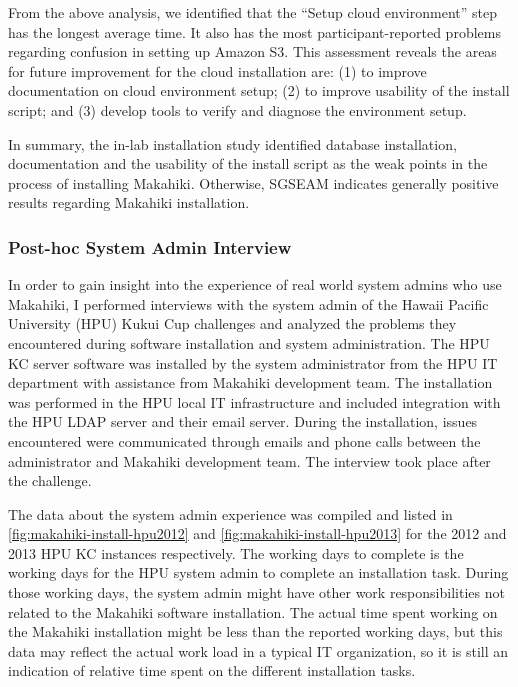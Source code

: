 From the above analysis, we identified that the ``Setup cloud environment'' step has the
longest average time. It also has the most participant-reported problems regarding confusion in setting up Amazon S3. This assessment reveals the areas for future improvement for the cloud installation are: (1) to improve documentation on cloud environment setup; (2) to improve usability of the install script; and (3) develop tools to verify and diagnose the environment setup.

In summary, the in-lab installation study identified database installation, documentation and the usability of the install script as the weak points in the process of installing Makahiki.  Otherwise, SGSEAM indicates generally positive results regarding Makahiki installation.

\subsubsection{Post-hoc System Admin Interview}
\label{sec:sysadmin-interview-result}

In order to gain insight into the experience of real world system admins who use Makahiki, I performed interviews with the system admin of the Hawaii Pacific University (HPU) Kukui Cup challenges and analyzed the problems they encountered during software installation and system administration. The HPU KC server software was installed by the system administrator from the HPU IT department with assistance from Makahiki development team. The installation was performed in the HPU local IT infrastructure and included integration with the HPU LDAP server and their email server.  During the installation, issues encountered were communicated through emails and phone calls between the administrator and Makahiki development team. The interview took place after the challenge. 

The data about the system admin experience was compiled and listed in \autoref{fig:makahiki-install-hpu2012} and \autoref{fig:makahiki-install-hpu2013} for the 2012 and 2013 HPU KC instances respectively. The working days to complete is the working days for the HPU system admin to complete an  installation task. During those working days, the system admin might have other work responsibilities not related to the Makahiki software installation. The actual time spent working on the Makahiki installation might be less than the reported working days, but this data may reflect the actual work load in a typical IT organization, so it is still an indication of relative time spent on the different installation tasks.

